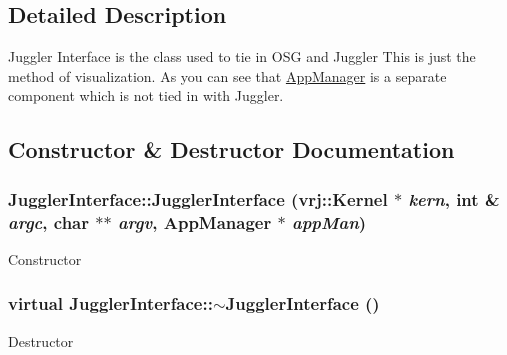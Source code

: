\subsection{Detailed Description}
Juggler Interface is the class used to tie in OSG and Juggler This is just the method of visualization. As you can see that \hyperlink{class_app_manager}{AppManager} is a separate component which is not tied in with Juggler. 

\subsection{Constructor \& Destructor Documentation}
\hypertarget{class_juggler_interface_a75fa9201e56035cb4b9f307c7c7ed6c1}{
\subsubsection[{JugglerInterface}]{\setlength{\rightskip}{0pt plus 5cm}JugglerInterface::JugglerInterface (vrj::Kernel $\ast$ {\em kern}, \/  int \& {\em argc}, \/  char $\ast$$\ast$ {\em argv}, \/  {\bf AppManager} $\ast$ {\em appMan})}}
\label{class_juggler_interface_a75fa9201e56035cb4b9f307c7c7ed6c1}
Constructor \hypertarget{class_juggler_interface_a1df97d920c8782507af2ac93d7e8c59a}{
\subsubsection[{$\sim$JugglerInterface}]{\setlength{\rightskip}{0pt plus 5cm}virtual JugglerInterface::$\sim$JugglerInterface ()}}
\label{class_juggler_interface_a1df97d920c8782507af2ac93d7e8c59a}
Destructor 

